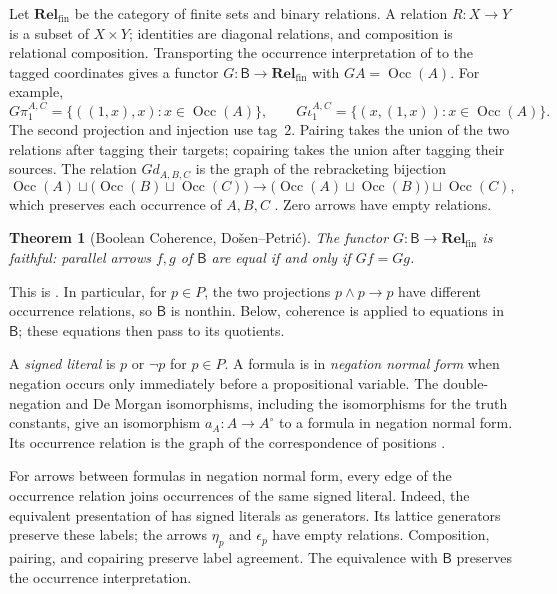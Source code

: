 \documentclass[11pt]{article}
\newtheorem{theorem}{Theorem}[section]
\newcommand{\B}{\mathsf B}
\newcommand{\Occ}{\operatorname{Occ}}
\newcommand{\Rel}{\mathbf{Rel}_{\mathrm{fin}}}
\begin{document}
Let $\Rel$ be the category of finite sets and binary relations.
A relation $R:X\to Y$ is a subset of $X\times Y$; identities are
diagonal relations, and composition is relational composition.
Transporting the occurrence interpretation of \cite{DP} to the
tagged coordinates gives a functor
$G:\B\to\Rel$ with $GA=\Occ(A)$.
For example,
\[
 G\pi_1^{A,C}=\{((1,x),x):x\in\Occ(A)\},\qquad
 G\iota_1^{A,C}=\{(x,(1,x)):x\in\Occ(A)\}.
\]
The second projection and injection use tag~$2$. Pairing takes the
union of the two relations after tagging their targets; copairing
takes the union after tagging their sources. The relation $Gd_{A,B,C}$
is the graph of the rebracketing bijection
\[
 \Occ(A)\sqcup\bigl(\Occ(B)\sqcup\Occ(C)\bigr)
 \longrightarrow
 \bigl(\Occ(A)\sqcup\Occ(B)\bigr)\sqcup\Occ(C),
\]
which preserves each occurrence of $A,B,C$
\cite[\S2.9, p.~60]{DP}. Zero arrows have empty relations.

\begin{theorem}[Boolean Coherence, Do\v{s}en--Petri\'c]
\label{thm:coherence}
The functor $G:\B\to\Rel$ is faithful: parallel arrows $f,g$ of
$\B$ are equal if and only if $Gf=Gg$.
\end{theorem}

This is \cite[\S14.2, p.~321]{DP}. In particular, for $p\in P$, the
two projections $p\wedge p\to p$ have different occurrence
relations, so $\B$ is nonthin. Below, coherence is applied to
equations in $\B$; these equations then pass to its quotients.

A \emph{signed literal} is $p$ or $\neg p$ for $p\in P$.
A formula is in \emph{negation normal form} when negation occurs only
immediately before a propositional variable. The double-negation and
De Morgan isomorphisms, including the isomorphisms for the truth
constants, give an isomorphism $a_A:A\to A^\circ$ to a formula in
negation normal form. Its occurrence relation is the graph of the
correspondence of positions \cite[\S14.1, pp.~313--315]{DP}.

For arrows between formulas in negation normal form, every edge of
the occurrence relation joins occurrences of the same signed literal.
Indeed, the equivalent presentation of \cite[\S14.2, pp.~318--321]{DP}
has signed literals as generators. Its lattice generators preserve
these labels; the arrows $\eta_p$ and $\epsilon_p$ have empty
relations. Composition, pairing, and copairing preserve label
agreement. The equivalence with $\B$ preserves the occurrence
interpretation.
\end{document}
